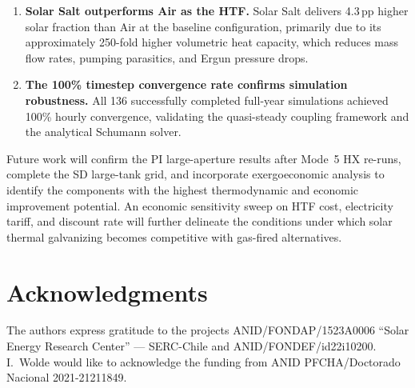 \documentclass[11pt,review,3p]{elsarticle}
\begin{document}
\begin{enumerate}[leftmargin=*, itemsep=3pt]
    \item \textbf{Solar Salt outperforms Air as the HTF.} Solar Salt delivers 4.3\,pp higher solar fraction than Air at the baseline configuration, primarily due to its approximately 250-fold higher volumetric heat capacity, which reduces mass flow rates, pumping parasitics, and Ergun pressure drops.

    \item \textbf{The 100\% timestep convergence rate confirms simulation robustness.} All 136 successfully completed full-year simulations achieved 100\% hourly convergence, validating the quasi-steady coupling framework and the analytical Schumann solver.
\end{enumerate}

Future work will confirm the PI large-aperture results after Mode~5 HX re-runs, complete the SD large-tank grid, and incorporate exergoeconomic analysis to identify the components with the highest thermodynamic and economic improvement potential. An economic sensitivity sweep on HTF cost, electricity tariff, and discount rate will further delineate the conditions under which solar thermal galvanizing becomes competitive with gas-fired alternatives.

\section{Acknowledgments}

The authors express gratitude to the projects ANID/FONDAP/1523A0006 ``Solar Energy Research Center'' --- SERC-Chile and ANID/FONDEF/id22i10200. I.~Wolde would like to acknowledge the funding from ANID PFCHA/Doctorado Nacional 2021-21211849.



\appendix
\end{document}
